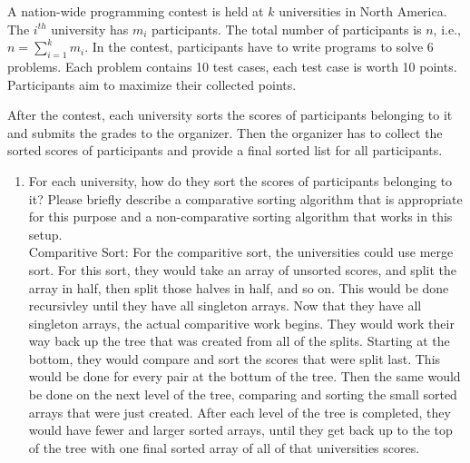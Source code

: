 \documentclass{article}
\begin{document}
 A nation-wide programming contest is held
at $k$ universities in North America. The $i^{th}$ university has
$m_{i}$ participants. The total number of participants is $n$, i.e.,
$n = \sum_{i=1}^{k}m_{i}$. In the contest, participants have to write
programs to solve 6 problems. Each problem contains 10 test cases,
each test case is worth 10 points. Participants aim to maximize their
collected points. 

After the contest, each university sorts the scores of participants
belonging to it and submits the grades to the organizer.  Then the
organizer has to collect the sorted scores of participants and provide
a final sorted list for all participants.

\begin{enumerate}

\item For each university, how do they sort the scores of participants
  belonging to it? Please briefly describe a comparative sorting
  algorithm that is appropriate for this purpose and a non-comparative
  sorting algorithm that works in this setup.\\

Comparitive Sort:  For the comparitive sort, the universities could use merge sort.  For this sort, they would take an array of unsorted scores, and split the array in half, then split those halves in half, and so on.  This would be done recursivley until they have all singleton arrays.  Now that they have all singleton arrays, the actual comparitive work begins.  They would work their way back up the tree that was created from all of the splits.  Starting at the bottom, they would compare and sort the scores that were split last.  This would be done for every pair at the  bottum of the tree.  Then the same would be done on the next level of the tree, comparing and sorting the small sorted arrays that were just created.  After each level of the tree is completed, they would have fewer and larger sorted arrays, until they get back up to the top of the tree with one final sorted array of all of that universities scores.


\end{enumerate}
\end{document}
